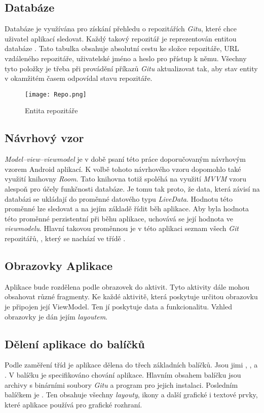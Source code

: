    \newpage
    \subsection{Databáze}
    Databáze je využívána pro získání přehledu o repozitářích \emph{Gitu}, které chce uživatel aplikací sledovat. Každý takový repozitář je reprezentován entitou databáze . Tato tabulka obsahuje absolutní cestu ke složce repozitáře, URL vzdáleného repozitáře, uživatelské jméno a heslo pro přístup k němu. Všechny tyto položky je třeba při provádění příkazů \emph{Gitu} aktualizovat tak, aby stav entity v okamžitém časem odpovídal stavu repozitáře.

    \begin{figure}[h!]
        \centering
        \vspace{0.5cm}
        \texttt{[image: Repo.png]}
        \caption{Entita repozitáře}
        \label{RepoTable}
    \end{figure}

    \subsection{Návrhový vzor}
    \emph{Model–view–viewmodel} je v době psaní této práce doporučovaným návrhovým vzorem Android aplikací. K volbě tohoto návrhového vzoru dopomohlo také využití knihovny \emph{Room}. Tato knihovna totiž spoléhá na využití \emph{MVVM} vzoru alespoň pro účely funkčnosti databáze. Je tomu tak proto, že data, která závisí na databázi se ukládají do proměnné datového typu \emph{LiveData}. Hodnotu této proměnné lze sledovat a na jejím základě řídit běh aplikace. Aby byla hodnota této proměnné perzistentní při běhu aplikace, uchovává se její hodnota ve \emph{viewmodelu}. Hlavní takovou proměnnou je v této aplikaci seznam všech \emph{Git} repozitářů, , který se nachází ve třídě .
    
    \subsection{Obrazovky Aplikace}
    Aplikace bude rozdělena podle obrazovek do aktivit. Tyto aktivity dále mohou obsahovat různé fragmenty. Ke každé aktivitě, která poskytuje určitou obrazovku je připojen její ViewModel. Ten jí poskytuje data a funkcionalitu. Vzhled obrazovky je dán jejím \emph{layoutem}.

    \newpage
    \subsection{Dělení aplikace do balíčků}
    Podle zaměření tříd je aplikace dělena do třech základních balíčků. Jsou jimi , , a . V balíčku  je specifikováno chování aplikace. Hlavním obsahem balíčku  jsou archivy s binárními soubory \emph{Gitu} a program  pro jejich instalaci. Posledním balíčkem je . Ten obsahuje všechny \emph{layouty}, ikony a další grafické i textové prvky, které aplikace používá pro grafické rozhraní.

